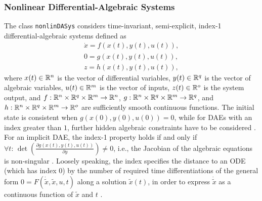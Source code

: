 \subsubsection{Nonlinear Differential-Algebraic Systems} \label{sec:nonlinearDASystems}

The class \texttt{nonlinDASys} considers time-invariant, semi-explicit, index-1 differential-algebraic systems defined as
\begin{equation}\label{eq:DAEsystem}
\begin{gathered}
 \dot{x} = f(x(t),y(t),u(t)), \\
 0 = g(x(t),y(t),u(t)), \\
 z = h(x(t),y(t),u(t)),
\end{gathered}
\end{equation}
where $x(t) \in \mathbb{R}^n$ is the vector of differential variables, $y(t) \in \mathbb{R}^q$ is the vector of algebraic variables, $u(t) \in \mathbb{R}^m$ is the vector of inputs, $z(t) \in \mathbb{R}^o$ is the system output, and $f: \mathbb{R}^n \times \mathbb{R}^q \times \mathbb{R}^m \to \mathbb{R}^n$, $g: \mathbb{R}^n \times \mathbb{R}^q \times \mathbb{R}^m \to \mathbb{R}^q$, and $h: \mathbb{R}^n \times \mathbb{R}^q \times \mathbb{R}^m \to \mathbb{R}^o$ are sufficiently smooth continuous functions. The initial state is consistent when $g(x(0),y(0),u(0)) = 0$, while for DAEs with an index greater than $1$, further hidden algebraic constraints have to be considered \cite[Chapter 9.1]{Ascher1998}. For an implicit DAE, the index-1 property holds if and only if $\forall t: \, \det(\frac{\partial g(x(t),y(t),u(t))}{\partial y})\neq 0$, i.e., the Jacobian of the algebraic equations is non-singular \cite[p. 34]{Brenan1989}. Loosely speaking, the index specifies the distance to an ODE (which has index $0$) by the number of required time differentiations of the general form $0 = F(\dot{\tilde{x}}, \tilde{x}, u, t)$ along a solution $\tilde{x}(t)$, in order to express $\dot{\tilde{x}}$ as a continuous function of $\tilde{x}$ and $t$ \cite[Chapter 9.1]{Ascher1998}. 

